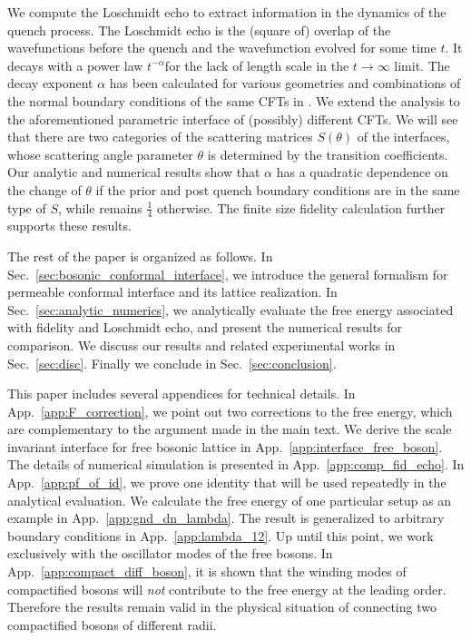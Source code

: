 We compute the Loschmidt echo to extract information in the dynamics of the quench process. The Loschmidt echo is the (square of) overlap of the wavefunctions before the quench and the wavefunction evolved for some time $t$. It decays with a power law $t^{- \alpha}$for the lack of length scale in the $t \rightarrow \infty$ limit. The decay exponent $\alpha$ has been calculated for various geometries and combinations of the normal boundary conditions of the same CFTs in . We extend the analysis to the aforementioned parametric interface of (possibly) different CFTs. We will see that there are two categories of the scattering matrices $S(\theta)$ of the interfaces, whose scattering angle parameter $\theta$ is determined by the transition coefficients. Our analytic and numerical results show that $\alpha$ has a quadratic dependence on the change of $\theta$ if the prior and post quench boundary conditions are in the same type of $S$, while remains $\frac{1}{4}$ otherwise. The finite size fidelity calculation further supports these results. 

The rest of the paper is organized as follows. In Sec.~\ref{sec:bosonic_conformal_interface}, we introduce the general formalism for permeable conformal interface and its lattice realization. In Sec.~\ref{sec:analytic_numerics}, we analytically evaluate the free energy associated with fidelity and Loschmidt echo, and present the numerical results for comparison. We discuss our results and related experimental works in Sec.~\ref{sec:disc}. Finally we conclude in Sec.~\ref{sec:conclusion}. 

This paper includes several appendices for technical details. In App.~\ref{app:F_correction}, we point out two corrections to the free energy, which are complementary to the argument made in the main text. We derive the scale invariant interface for free bosonic lattice in App.~\ref{app:interface_free_boson}. The details of numerical simulation is presented in App.~\ref{app:comp_fid_echo}. In App.~\ref{app:pf_of_id}, we prove one identity that will be used repeatedly in the analytical evaluation. We calculate the free energy of one particular setup as an example in App.~\ref{app:gnd_dn_lambda}. The result is generalized to arbitrary boundary conditions in App.~\ref{app:lambda_12}. Up until this point, we work exclusively with the oscillator modes of the free bosons. In App.~\ref{app:compact_diff_boson}, it is shown that the winding modes of compactified bosons will \emph{not} contribute to the free energy at the leading order. Therefore the results remain valid in the physical situation of connecting two compactified bosons of different radii.

